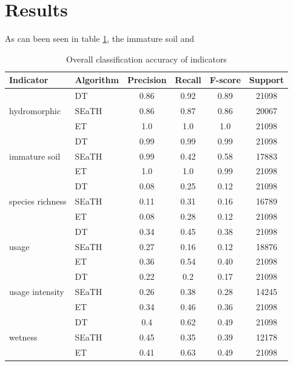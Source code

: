 \documentclass[authoryear,preprint,12pt,number]{elsarticle}
\begin{document}
\section{Results}
As can been seen in table \ref{tab:accuracy_indicators}, the immature soil and
\begin{table}
    \centering
    \begin{tabular}{l l c c c c}
    Indicator & Algorithm & Precision & Recall & F-score & 
    Support\\
    \hline
    \multirow{3}{*}{hydromorphic}
    & DT & 0.86 & 0.92 & 0.89 & 21098\\
    & SEaTH & 0.86 & 0.87 & 0.86 & 20067\\
    & ET & 1.0 & 1.0 & 1.0 & 21098\\
    \cline{2-6}
    \multirow{3}{*}{immature soil}
    & DT & 0.99 & 0.99 & 0.99 & 21098\\
    & SEaTH & 0.99 & 0.42 & 0.58 & 17883\\
    & ET & 1.0 & 1.0 & 0.99 & 21098\\
    \cline{2-6}
    \multirow{3}{*}{species richness}
    & DT & 0.08 & 0.25 & 0.12 & 21098\\
    & SEaTH & 0.11 & 0.31 & 0.16 & 16789\\
    & ET & 0.08 & 0.28 & 0.12 & 21098\\
    \cline{2-6}
    \multirow{3}{*}{usage}
    & DT & 0.34 & 0.45 & 0.38 & 21098\\
    & SEaTH & 0.27 & 0.16 & 0.12 & 18876\\
    & ET & 0.36 & 0.54 & 0.40 & 21098\\
    \cline{2-6}
    \multirow{3}{*}{usage intensity}
    & DT & 0.22 & 0.2 & 0.17 & 21098\\
    & SEaTH & 0.26 & 0.38 & 0.28 & 14245\\
    & ET & 0.34 & 0.46 & 0.36 & 21098\\
    \cline{2-6}
    \multirow{3}{*}{wetness}
    & DT & 0.4 & 0.62 & 0.49 & 21098\\
    & SEaTH & 0.45 & 0.35 & 0.39 & 12178\\
    & ET & 0.41 & 0.63 & 0.49 & 21098\\
    \end{tabular}
    \caption{Overall classification accuracy of 
indicators\label{tab:accuracy_indicators}}
\end{table}
\end{document}

